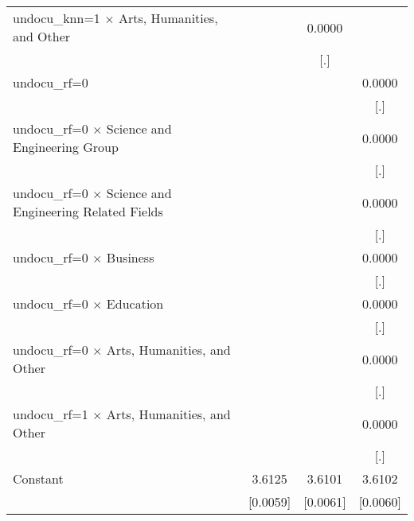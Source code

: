 \begin{table}[htbp]
\begin{tabular}{l*{3}{c}}
\addlinespace
undocu\_knn=1 $\times$ Arts, Humanities, and Other&                     &      0.0000         &                     \\
                    &                     &         [.]         &                     \\
\addlinespace
undocu\_rf=0         &                     &                     &      0.0000         \\
                    &                     &                     &         [.]         \\
\addlinespace
undocu\_rf=0 $\times$ Science and Engineering Group&                     &                     &      0.0000         \\
                    &                     &                     &         [.]         \\
\addlinespace
undocu\_rf=0 $\times$ Science and Engineering Related Fields&                     &                     &      0.0000         \\
                    &                     &                     &         [.]         \\
\addlinespace
undocu\_rf=0 $\times$ Business&                     &                     &      0.0000         \\
                    &                     &                     &         [.]         \\
\addlinespace
undocu\_rf=0 $\times$ Education&                     &                     &      0.0000         \\
                    &                     &                     &         [.]         \\
\addlinespace
undocu\_rf=0 $\times$ Arts, Humanities, and Other&                     &                     &      0.0000         \\
                    &                     &                     &         [.]         \\
\addlinespace
undocu\_rf=1 $\times$ Arts, Humanities, and Other&                     &                     &      0.0000         \\
                    &                     &                     &         [.]         \\
\addlinespace
Constant            &      3.6125\sym{***}&      3.6101\sym{***}&      3.6102\sym{***}\\
                    &    [0.0059]         &    [0.0061]         &    [0.0060]         \\

\end{tabular}
\end{table}
